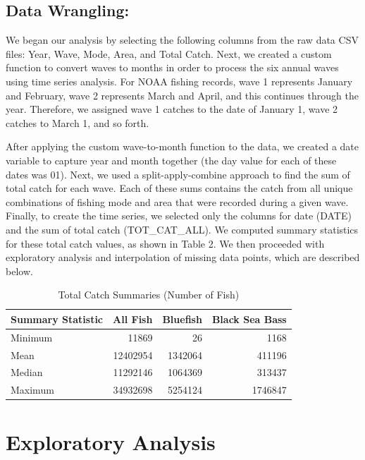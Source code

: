 \documentclass[
  12pt,
]{article}
\begin{document}
\hypertarget{data-wrangling}{%
\subsection{Data Wrangling:}\label{data-wrangling}}

We began our analysis by selecting the following columns from the raw
data CSV files: Year, Wave, Mode, Area, and Total Catch. Next, we
created a custom function to convert waves to months in order to process
the six annual waves using time series analysis. For NOAA fishing
records, wave 1 represents January and February, wave 2 represents March
and April, and this continues through the year. Therefore, we assigned
wave 1 catches to the date of January 1, wave 2 catches to March 1, and
so forth.

After applying the custom wave-to-month function to the data, we created
a date variable to capture year and month together (the day value for
each of these dates was 01). Next, we used a split-apply-combine
approach to find the sum of total catch for each wave. Each of these
sums contains the catch from all unique combinations of fishing mode and
area that were recorded during a given wave. Finally, to create the time
series, we selected only the columns for date (DATE) and the sum of
total catch (TOT\_CAT\_ALL). We computed summary statistics for these
total catch values, as shown in Table 2. We then proceeded with
exploratory analysis and interpolation of missing data points, which are
described below.

\begin{table}[H]

\caption{\label{tab:table2}Total Catch Summaries (Number of Fish)}
\centering
\begin{tabular}[t]{l|r|r|r}
\hline
Summary Statistic & All Fish & Bluefish & Black Sea Bass\\
\hline
Minimum & 11869 & 26 & 1168\\
\hline
Mean & 12402954 & 1342064 & 411196\\
\hline
Median & 11292146 & 1064369 & 313437\\
\hline
Maximum & 34932698 & 5254124 & 1746847\\
\hline
\end{tabular}
\end{table}
\newpage

\hypertarget{exploratory-analysis}{%
\section{Exploratory Analysis}\label{exploratory-analysis}}
\end{document}
